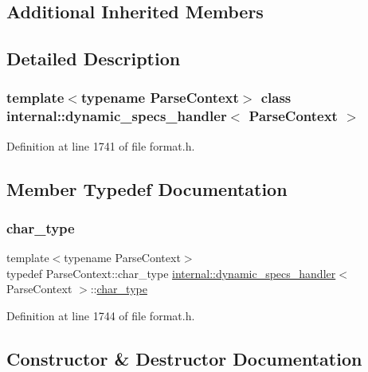 \subsection*{Additional Inherited Members}


\subsection{Detailed Description}
\subsubsection*{template$<$typename Parse\+Context$>$\newline
class internal\+::dynamic\+\_\+specs\+\_\+handler$<$ Parse\+Context $>$}



Definition at line 1741 of file format.\+h.



\subsection{Member Typedef Documentation}
\mbox{\label{classinternal_1_1dynamic__specs__handler_a718fa7f12b9f1a5c59fa747214d18f13}} 
\subsubsection{\texorpdfstring{char\+\_\+type}{char\_type}}
{\footnotesize\ttfamily template$<$typename Parse\+Context$>$ \\
typedef Parse\+Context\+::char\+\_\+type \hyperlink{classinternal_1_1dynamic__specs__handler}{internal\+::dynamic\+\_\+specs\+\_\+handler}$<$ Parse\+Context $>$\+::\hyperlink{classinternal_1_1dynamic__specs__handler_a718fa7f12b9f1a5c59fa747214d18f13}{char\+\_\+type}}



Definition at line 1744 of file format.\+h.



\subsection{Constructor \& Destructor Documentation}
\mbox{\label{classinternal_1_1dynamic__specs__handler_af06235807a4b30fb270a920422863768}} 
